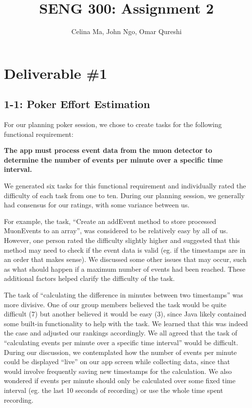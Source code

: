 \documentclass[11pt,a4paper]{article}
\title{\vspace{-2.0cm} \textbf{SENG 300: Assignment 2}}
\author{Celina Ma, John Ngo, Omar Qureshi}
\begin{document}
\maketitle
\def\textfraction{.01}
\def\topfraction{.99}
\section*{Deliverable \#1}

\subsection*{1-1: Poker Effort Estimation}

For our planning poker session, we chose to create tasks for the following functional requirement:

\textbf{The app must process event data from the muon detector to determine the number of events per minute over a specific time interval.}

We generated six tasks for this functional requirement and individually rated the difficulty of each task from one to ten. During our planning session, we generally had consensus for our ratings, with some variance between us. 

For example, the task, “Create an addEvent method to store processed MuonEvents to an array”, was considered to be relatively easy by all of us. However, one person rated the difficulty slightly higher and suggested that this method may need to check if the event data is valid (eg. if the timestamps are in an order that makes sense). We discussed some other issues that may occur, such as what should happen if a maximum number of events had been reached. These additional factors helped clarify the difficulty of the task.

The task of “calculating the difference in minutes between two timestamps” was more divisive. One of our group members believed the task would be quite difficult (7) but another believed it would be easy (3), since Java likely contained some built-in functionality to help with the task. We learned that this was indeed the case and adjusted our rankings accordingly.
We all agreed that the task of “calculating events per minute over a specific time interval” would be difficult. During our discussion, we contemplated how the number of events per minute could be displayed “live” on our app screen while collecting data, since that would involve frequently saving new timestamps for the calculation. We also wondered if events per minute should only be calculated over some fixed time interval (eg. the last 10 seconds of recording) or use the whole time spent recording.
\end{document}
